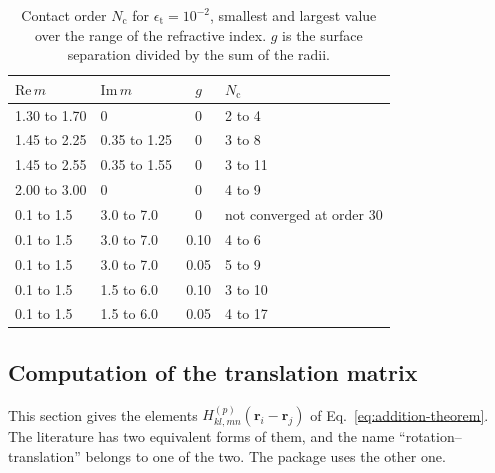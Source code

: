 \documentclass[11pt,a4paper]{article}
\renewcommand{\arraystretch}{1.6}
\begin{document}
\begin{table}[htbp]
\caption{Contact order $N_\mathrm{c}$ for $\epsilon_\mathrm{t} = 10^{-2}$, smallest and largest value over the range of the refractive index. $g$ is the surface separation divided by the sum of the radii.}
\label{tab:contact-orders}
\centering
\renewcommand{\arraystretch}{1.2}
\begin{tabular}{@{} llcl @{}}
\toprule
$\mathrm{Re}\,m$ & $\mathrm{Im}\,m$ & $g$ & $N_\mathrm{c}$ \\
\midrule
1.30 to 1.70 & 0 & 0 & 2 to 4 \\
1.45 to 2.25 & 0.35 to 1.25 & 0 & 3 to 8 \\
1.45 to 2.55 & 0.35 to 1.55 & 0 & 3 to 11 \\
2.00 to 3.00 & 0 & 0 & 4 to 9 \\
0.1 to 1.5 & 3.0 to 7.0 & 0 & not converged at order 30 \\
0.1 to 1.5 & 3.0 to 7.0 & 0.10 & 4 to 6 \\
0.1 to 1.5 & 3.0 to 7.0 & 0.05 & 5 to 9 \\
0.1 to 1.5 & 1.5 to 6.0 & 0.10 & 3 to 10 \\
0.1 to 1.5 & 1.5 to 6.0 & 0.05 & 4 to 17 \\
\bottomrule
\end{tabular}
\end{table}

\subsection{Computation of the translation matrix}
\label{sec:translation}

This section gives the elements $H^{(p)}_{kl,mn}(\bm{r}_i - \bm{r}_j)$ of Eq.~\eqref{eq:addition-theorem}.
The literature has two equivalent forms of them, and the name ``rotation--translation'' belongs to one of the two.
The package uses the other one.
\end{document}
